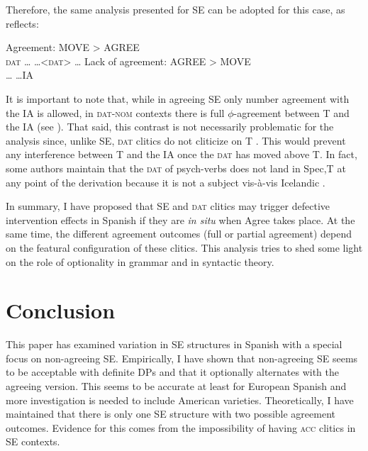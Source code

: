 \documentclass[output=paper,colorlinks,citecolor=brown]{langscibook}
\begin{document}
Therefore, the same analysis presented for SE can be adopted for this case, as  reflects:

\ea \label{ex:05:analysisDAT}
    \ea Agreement: MOVE > AGREE \\
      \textsc{dat} \dots {} \dots <\textsc{dat}> \dots {}
      \vspace{3mm}
    \ex Lack of agreement: AGREE > MOVE \\
     \dots {} \dots IA
\z\z

\vspace{3mm}

It is important to note that, while in agreeing SE only number agreement with the IA is allowed, in \textsc{dat}-\textsc{nom} contexts there is full $\phi$-agreement between T and the IA (see ). That said, this contrast is not necessarily problematic for the analysis since, unlike SE, \textsc{dat} clitics do not cliticize on T
\citep[128]{DAlessandro2007}. This would prevent any interference between T and the IA once the \textsc{dat} has moved above T. In fact, some authors maintain that the \textsc{dat} of psych-verbs does not land in Spec,T at any point of the derivation because it is not a subject vis-à-vis Icelandic \citep{Gutierrez-Bravo2006, Fabregasetal2017}.

In summary, I have proposed that SE and \textsc{dat} clitics may trigger defective intervention effects in Spanish if they are \textit{in situ} when Agree takes place. At the same time, the different agreement outcomes (full or partial agreement) depend on the featural configuration of these clitics. This analysis tries to shed some light on the role of optionality in grammar and in syntactic theory.

\section{Conclusion}\label{05:sec:fernandez:5}

This paper has examined variation in SE structures in Spanish with a special focus on non-agreeing SE. Empirically, I have shown that non-agreeing SE seems to be acceptable with definite DPs and that it optionally alternates with the agreeing version. This seems to be accurate at least for European Spanish and more investigation is needed to include American varieties.
Theoretically, I have maintained that there is only one SE structure with two possible agreement outcomes. Evidence for this comes from the impossibility of having \textsc{acc} clitics in SE contexts.
\end{document}
